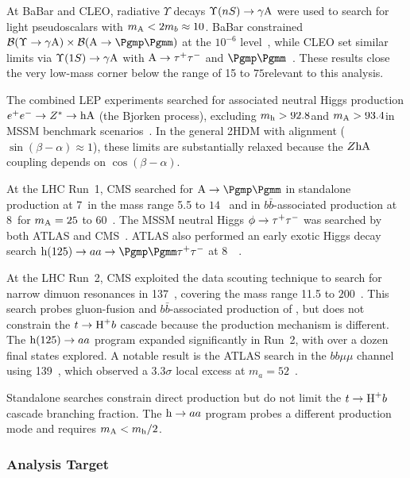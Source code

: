 At BaBar and CLEO, radiative $\Upsilon$ decays $\Upsilon(nS) \to \gamma \text{A}$ were used to search for light pseudoscalars with $m_{\text{A}} < 2m_b \approx 10$\GeV. BaBar constrained $\mathcal{B}(\Upsilon \to \gamma \PA) \times \mathcal{B}(\PA \to \Pgmp\Pgmm)$ at the $10^{-6}$ level~\cite{BaBar:2009lbr}, while CLEO set similar limits via $\Upsilon(1S) \to \gamma \text{A}$ with $\text{A} \to \tau^+\tau^-$ and $\Pgmp\Pgmm$~\cite{CLEO:2008phs}. These results close the very low-mass corner below the \mA range of 15 to $75$\GeV relevant to this analysis.

The combined LEP experiments searched for associated neutral Higgs production $e^+e^- \to Z^* \to \text{h}\text{A}$ (the Bjorken process), excluding $m_{\text{h}} > 92.8$\GeV and $m_{\text{A}} > 93.4$\GeV in MSSM benchmark scenarios~\cite{LEPHiggs:2006drw}. In the general 2HDM with alignment ($\sin(\beta - \alpha) \approx 1$), these limits are substantially relaxed because the $Z\text{h}\text{A}$ coupling depends on $\cos(\beta - \alpha)$.

At the LHC Run~1, CMS searched for $\PA \to \Pgmp\Pgmm$ in standalone production at 7~\TeV in the mass range 5.5 to $14$\GeV~\cite{CMS:2012fgd} and in $b\bar{b}$-associated production at 8~\TeV for $m_{\text{A}} = 25$ to $60$\GeV~\cite{CMS:2017dmg}. The MSSM neutral Higgs $\phi \to \tau^+\tau^-$ was searched by both ATLAS and CMS~\cite{CMS:2014cdp}. ATLAS also performed an early exotic Higgs decay search $\Ph(125) \to aa \to \Pgmp\Pgmm\PGtp\PGtm$ at 8~\TeV~\cite{ATLAS:2015unc}.

At the LHC Run~2, CMS exploited the data scouting technique to search for narrow dimuon resonances in 137~\fbinv, covering the mass range 11.5 to $200$\GeV~\cite{CMS:2019lwf}. This search probes gluon-fusion and $b\bar{b}$-associated production of \PA, but does not constrain the $t \to \text{H}^+ b$ cascade because the production mechanism is different. The $\text{h}(125) \to aa$ program expanded significantly in Run~2, with over a dozen final states explored. A notable result is the ATLAS search in the $bb\mu\mu$ channel using 139~\fbinv, which observed a $3.3\sigma$ local excess at $m_a = 52$\GeV~\cite{ATLAS:2021hbr}.

Standalone \PA searches constrain direct production but do not limit the $t \to \text{H}^+ b$ cascade branching fraction. The $\text{h} \to aa$ program probes a different production mode and requires $m_{\text{A}} < m_{\text{h}}/2$.

\subsubsection{Analysis Target}

